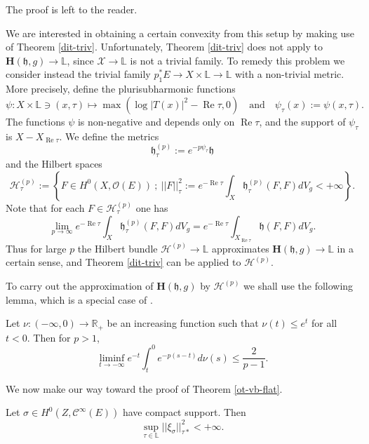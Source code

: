 \documentclass[12pt,hidelinks]{amsart}
\newcommand{\noi}{\noindent}
\newcommand{\cO}{{\mathcal O}}
\newcommand{\sC}{{\mathscr C}}
\newcommand{\sH}{{\mathscr H}}
\newcommand{\sX}{{\mathscr X}}
\newcommand{\fh}{{\mathfrak h}}
\newcommand{\bbL}{{\mathbb L}}
\newcommand{\bbR}{{\mathbb R}}
\renewcommand{\Re}{\operatorname{Re}}
\begin{document}
\noi The proof is left to the reader.  


We are interested in obtaining a certain convexity from this setup by making use of Theorem \ref{dit-triv}.  Unfortunately, Theorem \ref{dit-triv} does not apply to $\mathbf{H}(\fh, g) \to \bbL$, since $\sX \to \bbL$ is not a trivial family.  To remedy this problem we consider instead the trivial family $p_1 ^* E \to X \times \bbL \to \bbL$ with a non-trivial metric.  More precisely, define the plurisubharmonic functions 
\[
\psi : X \times \bbL \ni (x, \tau) \mapsto \max ( \log |T(x)|^2 - \Re \tau, 0) \quad \text{and} \quad \psi _{\tau}(x) := \psi (x,\tau).
\]
The functions $\psi$ is non-negative and depends only on $\Re \tau$, and the support of $\psi _{\tau}$ is $X- X_{\Re \tau}$.  We define the metrics 
\[
\fh ^{(p)} _{\tau} := e^{-p \psi _{\tau}} \fh
\]
and the Hilbert spaces 
\[
\sH ^{(p)} _{\tau} :=  \left \{ F \in H^0(X, \cO (E))\ ;\ ||F||^2_{\tau} := e^{-\Re \tau} \int _{X} \fh ^{(p)} _{\tau}(F,F) dV_g < +\infty \right \}.
\] 
Note that for each $F \in \sH^{(p)} _{\tau}$ one has 
\[
\lim _{p \to \infty} e^{-\Re \tau} \int _{X} \fh^{(p)} _{\tau} (F,F) dV_g = e^{-\Re \tau} \int _{X_{\Re \tau}} \!\!\!\!\!\!\!\! \fh (F,F) dV_g.
\]
Thus for large $p$ the Hilbert bundle $\sH ^{(p)} \to \bbL$ approximates $\mathbf{H} (\fh , g) \to \bbL$ in a certain sense, and Theorem \ref{dit-triv} can be applied to $\sH ^{(p)}$.

To carry out the approximation of $\mathbf{H}(\fh, g)$ by $\sH^{(p)}$ we shall use the following lemma, which is a special case of \cite[Lemma 3.4]{bl}.  

\begin{lem}\label{deal-with-p}
Let $\nu : (-\infty, 0) \to \bbR_+$ be an increasing function such that $\nu (t) \le e^t$ for all $t < 0$.  Then for $p > 1$, 
\begin{equation}\label{lim-inf}
\liminf _{t \to -\infty} e^{-t} \int _t ^0 e^{-p(s-t)} d\nu (s) \le \frac{2}{p-1}.
\end{equation}
\end{lem}

\medskip

We now make our way toward the proof of Theorem \ref{ot-vb-flat}.  

\begin{lem}\label{xi_g-is-bounded}
Let $\sigma \in H^0(Z, \sC^{\infty}(E))$ have compact support.  Then 
\[
\sup _{\tau \in \bbL} ||\xi_{\sigma}||^2_{\tau *} < +\infty.
\]
\end{lem}
\end{document}
